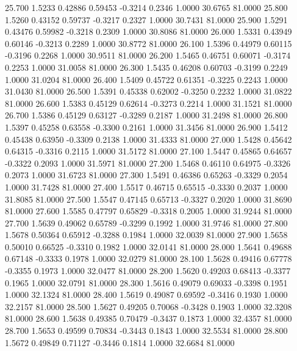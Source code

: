   25.700   1.5233   0.42886   0.59453  -0.3214   0.2346   1.0000  30.6765  81.0000
  25.800   1.5260   0.43152   0.59737  -0.3217   0.2327   1.0000  30.7431  81.0000
  25.900   1.5291   0.43476   0.59982  -0.3218   0.2309   1.0000  30.8086  81.0000
  26.000   1.5331   0.43949   0.60146  -0.3213   0.2289   1.0000  30.8772  81.0000
  26.100   1.5396   0.44979   0.60115  -0.3196   0.2268   1.0000  30.9511  81.0000
  26.200   1.5465   0.46751   0.60071  -0.3174   0.2253   1.0000  31.0058  81.0000
  26.300   1.5435   0.46208   0.60703  -0.3199   0.2249   1.0000  31.0204  81.0000
  26.400   1.5409   0.45722   0.61351  -0.3225   0.2243   1.0000  31.0430  81.0000
  26.500   1.5391   0.45338   0.62002  -0.3250   0.2232   1.0000  31.0822  81.0000
  26.600   1.5383   0.45129   0.62614  -0.3273   0.2214   1.0000  31.1521  81.0000
  26.700   1.5386   0.45129   0.63127  -0.3289   0.2187   1.0000  31.2498  81.0000
  26.800   1.5397   0.45258   0.63558  -0.3300   0.2161   1.0000  31.3456  81.0000
  26.900   1.5412   0.45438   0.63950  -0.3309   0.2138   1.0000  31.4333  81.0000
  27.000   1.5428   0.45642   0.64315  -0.3316   0.2115   1.0000  31.5172  81.0000
  27.100   1.5447   0.45865   0.64657  -0.3322   0.2093   1.0000  31.5971  81.0000
  27.200   1.5468   0.46110   0.64975  -0.3326   0.2073   1.0000  31.6723  81.0000
  27.300   1.5491   0.46386   0.65263  -0.3329   0.2054   1.0000  31.7428  81.0000
  27.400   1.5517   0.46715   0.65515  -0.3330   0.2037   1.0000  31.8085  81.0000
  27.500   1.5547   0.47145   0.65713  -0.3327   0.2020   1.0000  31.8690  81.0000
  27.600   1.5585   0.47797   0.65829  -0.3318   0.2005   1.0000  31.9244  81.0000
  27.700   1.5639   0.49062   0.65789  -0.3299   0.1992   1.0000  31.9746  81.0000
  27.800   1.5678   0.50364   0.65912  -0.3288   0.1984   1.0000  32.0039  81.0000
  27.900   1.5658   0.50010   0.66525  -0.3310   0.1982   1.0000  32.0141  81.0000
  28.000   1.5641   0.49688   0.67148  -0.3333   0.1978   1.0000  32.0279  81.0000
  28.100   1.5628   0.49416   0.67778  -0.3355   0.1973   1.0000  32.0477  81.0000
  28.200   1.5620   0.49203   0.68413  -0.3377   0.1965   1.0000  32.0791  81.0000
  28.300   1.5616   0.49079   0.69033  -0.3398   0.1951   1.0000  32.1324  81.0000
  28.400   1.5619   0.49087   0.69592  -0.3416   0.1930   1.0000  32.2157  81.0000
  28.500   1.5627   0.49205   0.70068  -0.3428   0.1903   1.0000  32.3208  81.0000
  28.600   1.5638   0.49385   0.70479  -0.3437   0.1873   1.0000  32.4357  81.0000
  28.700   1.5653   0.49599   0.70834  -0.3443   0.1843   1.0000  32.5534  81.0000
  28.800   1.5672   0.49849   0.71127  -0.3446   0.1814   1.0000  32.6684  81.0000

